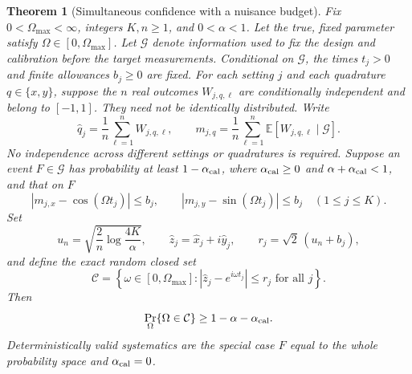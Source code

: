 \documentclass[11pt]{article}
\newtheorem{theorem}{Theorem}[section]
\theoremstyle{definition}
\begin{document}
\begin{theorem}[Simultaneous confidence with a nuisance budget]
\label{thm:operational-confidence}
Fix $0<\Omega_{\max}<\infty$, integers $K,n\ge1$, and
$0<\alpha<1$. Let the true, fixed parameter satisfy
$\Omega\in[0,\Omega_{\max}]$. Let $\mathcal G$ denote information used
to fix the design and calibration before the target measurements. Conditional
on $\mathcal G$, the times $t_j>0$ and finite allowances $b_j\ge0$ are
fixed. For each setting $j$ and each quadrature $q\in\{x,y\}$, suppose
the $n$ real outcomes $W_{j,q,\ell}$ are conditionally independent and
belong to $[-1,1]$. They need not be identically distributed. Write
\[
 \widehat q_j=\frac1n\sum_{\ell=1}^n W_{j,q,\ell},\qquad
 m_{j,q}=\frac1n\sum_{\ell=1}^n
       \mathbb E[W_{j,q,\ell}\mid\mathcal G].
\]
No independence across different settings or quadratures is required.
Suppose an event $F\in\mathcal G$ has probability at least $1-\alpha_{\rm cal}$,
where $\alpha_{\rm cal}\ge0$ and $\alpha+\alpha_{\rm cal}<1$, and that on $F$
\begin{equation}
 |m_{j,x}-\cos(\Omega t_j)|\le b_j,\qquad
 |m_{j,y}-\sin(\Omega t_j)|\le b_j
 \quad (1\le j\le K).
 \label{eq:operational-nuisance-budget}
\end{equation}
Set
\[
 u_n=\sqrt{\frac2n\log\frac{4K}{\alpha}},\qquad
 \widehat z_j=\widehat x_j+i\widehat y_j,\qquad
 r_j=\sqrt2\,(u_n+b_j),
\]
and define the exact random closed set
\begin{equation}
 \mathcal C=\left\{\omega\in[0,\Omega_{\max}]:
   |\widehat z_j-e^{i\omega t_j}|\le r_j
   \text{ for all }j\right\}.
 \label{eq:operational-confidence-set}
\end{equation}
Then
\begin{equation}
 \Pr_\Omega\{\Omega\in\mathcal C\}\ge1-\alpha-\alpha_{\rm cal}.
 \label{eq:operational-coverage}
\end{equation}
Deterministically valid systematics are the special case $F$ equal to the
whole probability space and $\alpha_{\rm cal}=0$.
\end{theorem}
\end{document}
